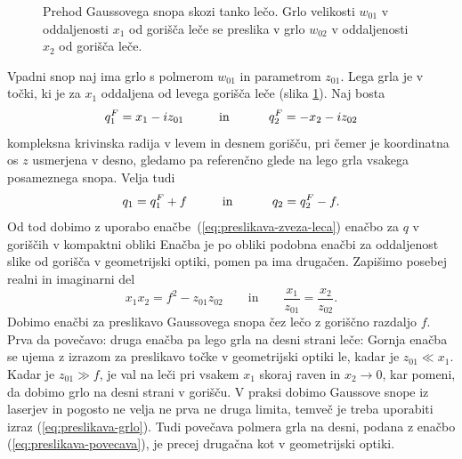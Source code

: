 \begin{figure}[h]
\centering
\def\svgwidth{120truemm} 

\caption{Prehod Gaussovega snopa skozi
tanko lečo. Grlo velikosti $w_{01}$ v oddaljenosti $x_{1}$ od gorišča
leče se preslika v grlo $w_{02}$ v oddaljenosti $x_{2}$ od gorišča
leče.}
\label{fig:Prehod-Gaussovega-snopa}
\end{figure}
Vpadni snop naj ima grlo s polmerom $w_{01}$ in parametrom $z_{01}$. Lega grla je 
v točki, ki je za $x_{1}$ oddaljena od levega gorišča leče (slika
\ref{fig:Prehod-Gaussovega-snopa}). Naj bosta 
\begin{equation}
q_{1}^{F}=x_{1}-iz_{01}\mbox{\hskip1cm in \hskip1cm}q_{2}^{F}=-x_{2}-iz_{02}
\end{equation}
 kompleksna krivinska radija v levem in desnem gorišču, pri čemer je koordinatna os $z$ 
 usmerjena v desno, gledamo pa referenčno glede na lego grla vsakega posameznega snopa. Velja tudi
\begin{equation}
q_{1}=q_{1}^{F}+f\mbox{\hskip1cm in \hskip1cm}q_{2}=q_{2}^{F}-f.
\end{equation}
 Od tod dobimo z uporabo enačbe~(\ref{eq:preslikava-zveza-leca}) enačbo
za $q$ v goriščih v kompaktni obliki 
 Enačba je po obliki podobna enačbi za oddaljenost slike od gorišča v
geometrijski optiki, pomen pa ima drugačen. Zapišimo posebej realni
in imaginarni del 
\begin{equation}
x_{1}x_{2}=f^{2}-z_{01}z_{02} \qquad \mathrm{in} \qquad
\frac{x_{1}}{z_{01}}=\frac{x_{2}}{z_{02}}.
\end{equation}
Dobimo enačbi za preslikavo Gaussovega snopa čez lečo z goriščno razdaljo $f$.
Prva da povečavo:
druga enačba pa lego grla na desni strani leče: 
Gornja enačba se ujema z izrazom za preslikavo točke v geometrijski
optiki le, kadar je $z_{01}\ll x_{1}$. Kadar je $z_{01}\gg f$, je
val na leči pri vsakem $x_{1}$ skoraj raven in $x_2 \to 0$, kar pomeni, da dobimo 
grlo na desni strani v gorišču. V praksi dobimo Gaussove snope iz laserjev in pogosto ne
velja ne prva ne druga limita, temveč je treba uporabiti izraz (\ref{eq:preslikava-grlo}).
Tudi povečava polmera grla na desni, podana z enačbo (\ref{eq:preslikava-povecava}),
je precej drugačna kot v geometrijski optiki.\\

